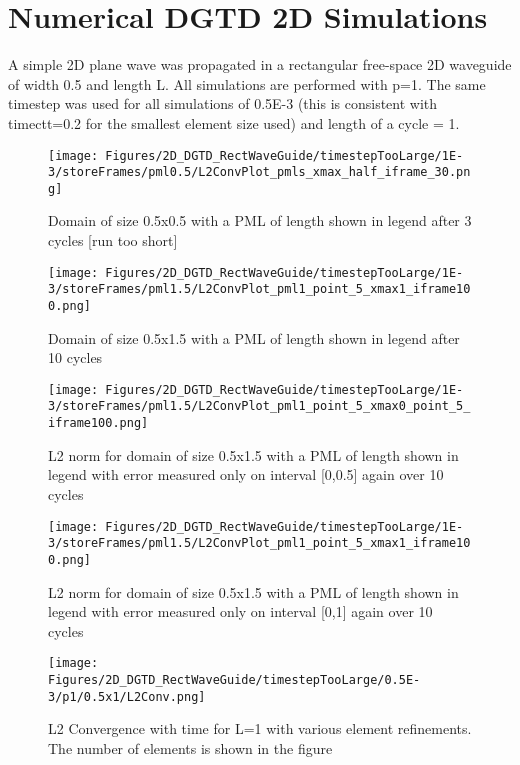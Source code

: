 
\chapter{Numerical DGTD 2D Simulations} %
\label{Chapter6}

A simple 2D plane wave was propagated in a rectangular free-space 2D waveguide of width 0.5 and length L. All simulations are performed with p=1.
The same timestep was used for all simulations of 0.5E-3 (this is consistent with timectt=0.2 for the smallest element size used) and length of a cycle = 1.

\begin{figure}
\texttt{[image: Figures/2D\_DGTD\_RectWaveGuide/timestepTooLarge/1E-3/storeFrames/pml0.5/L2ConvPlot\_pmls\_xmax\_half\_iframe\_30.png]}
\caption{Domain of size 0.5x0.5 with a PML of length shown in legend after 3 cycles [run too short]}
\end{figure}

\begin{figure}
\texttt{[image: Figures/2D\_DGTD\_RectWaveGuide/timestepTooLarge/1E-3/storeFrames/pml1.5/L2ConvPlot\_pml1\_point\_5\_xmax1\_iframe100.png]}
\caption{Domain of size 0.5x1.5 with a PML of length shown in legend after 10 cycles}
\end{figure}

\begin{figure}
\texttt{[image: Figures/2D\_DGTD\_RectWaveGuide/timestepTooLarge/1E-3/storeFrames/pml1.5/L2ConvPlot\_pml1\_point\_5\_xmax0\_point\_5\_iframe100.png]}
\caption{L2 norm for domain of size 0.5x1.5 with a PML of length shown in legend with error measured only on interval [0,0.5] again over 10 cycles}
\end{figure}

\begin{figure}
\texttt{[image: Figures/2D\_DGTD\_RectWaveGuide/timestepTooLarge/1E-3/storeFrames/pml1.5/L2ConvPlot\_pml1\_point\_5\_xmax1\_iframe100.png]}
\caption{L2 norm for domain of size 0.5x1.5 with a PML of length shown in legend with error measured only on interval [0,1] again over 10 cycles}
\end{figure}

\begin{figure}
\texttt{[image: Figures/2D\_DGTD\_RectWaveGuide/timestepTooLarge/0.5E-3/p1/0.5x1/L2Conv.png]}
\caption{L2 Convergence with time for L=1 with various element refinements. The number of elements is shown in the figure}
\end{figure}

